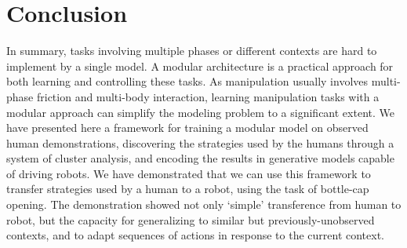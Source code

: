 \section{Conclusion}
\label{sec:conclusion}
In summary, tasks involving multiple phases or different contexts are
hard to implement by a single model. A modular architecture is a
practical approach for both learning and controlling these tasks. As
manipulation usually involves multi-phase friction and multi-body
interaction, learning manipulation tasks with a modular approach can
simplify the modeling problem to a significant extent. We have
presented here a framework for training a modular model on observed
human demonstrations, discovering the strategies used by the humans
through a system of cluster analysis, and encoding
the results in generative models capable of driving robots. We have
demonstrated that we can use this framework to transfer strategies
used by a human to a robot, using the task of bottle-cap
opening. The demonstration showed not only `simple' transference from
human to robot, but the capacity for generalizing to similar but
previously-unobserved contexts, and to adapt sequences of actions in
response to the current context.




